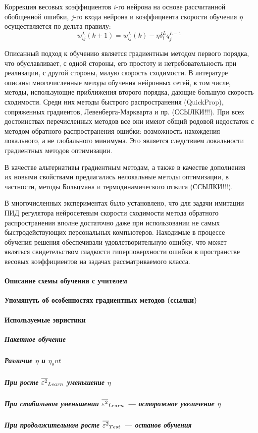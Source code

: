 Коррекция весовых коэффициентов $i$-го нейрона на основе рассчитанной
обобщенной ошибки, $j$-го входа нейрона и коэффициента скорости
обучения $\eta$ осуществляется по дельта-правилу:
\begin{equation}
  w^L_{ij}(k+1)=w^L_{ij}(k)-\eta\delta^L_i q^{L-1}_j
\end{equation}

Описанный подход к обучению является градиентным методом первого
порядка, что обуславливает, с одной стороны, его простоту и
нетребовательность при реализации, с другой стороны, малую скорость
сходимости.  В литературе описаны многочисленные методы обучения
нейронных сетей, в том числе, методы, использующие приближения второго
порядка, дающие большую скорость сходимости.  Среди них методы
быстрого распространения (QuickProp), сопряженных градиентов,
Левенберга-Маркварта и пр. (ССЫЛКИ!!!).  При всех достоинствах
перечисленных методов все они имеют общий родовой недостаток с методом
обратного распространения ошибки: возможность нахождения локального, а
не глобального минимума.  Это является следствием локальности
градиентных методов оптимизации.

В качестве альтернативы градиентным методам, а также в качестве
дополнения их новыми свойствами предлагались нелокальные методы
оптимизации, в частности, методы Больцмана и термодинамического отжига
(ССЫЛКИ!!!).

В многочисленных экспериментах было установлено, что для задачи
имитации ПИД регулятора нейросетевым скорости сходимости метода
обратного распространения вполне достаточно даже при использовании не
самых быстродействующих персональных компьютеров.  Находимые в
процессе обучения решения обеспечивали удовлетворительную ошибку, что
может являться свидетельством гладкости гиперповерхности ошибки в
пространстве весовых коэффициентов на задачах рассматриваемого класса.

\paragraph{Описание схемы обучения с учителем}
\paragraph{Упомянуть об особенностях градиентных методов (ссылки)}
\paragraph{Используемые эвристики}
\subparagraph{Пакетное обучение}
\subparagraph{Различие $\eta$ и $\eta_out$}
\subparagraph{При росте $\overline{\varepsilon^2}_{Learn}$ уменьшение $\eta$}
\subparagraph{При стабильном  уменьшении $\overline{\varepsilon^2}_{Learn}$ --- осторожное увеличение $\eta$}
\subparagraph{При продолжительном росте $\overline{\varepsilon^2}_{Test}$ --- останов обучения}


